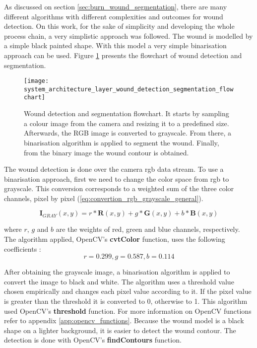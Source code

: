 As discussed on section \ref{sec:burn_wound_segmentation}, there are many different algorithms with different complexities and outcomes for wound detection. On this work, for the sake of simplicity and developing the whole process chain, a very simplistic approach was followed. The wound is modelled by a simple black painted shape. With this model a very simple binarisation approach can be used. Figure \ref{fig:system_architecture_layer_wound_detection_segmentation_flowchart} presents the flowchart of wound detection and segmentation.\\

\begin{figure}[htbp]
	\centering
	\texttt{[image: system\_architecture\_layer\_wound\_detection\_segmentation\_flowchart]}
	\caption[Wound detection and segmentation flowchart.]{Wound detection and segmentation flowchart. It starts by sampling a colour image from the camera and resizing it to a predefined size. Afterwards, the RGB image is converted to grayscale. From there, a binarisation algorithm is applied to segment the wound. Finally, from the binary image the wound contour is obtained.}
	\label{fig:system_architecture_layer_wound_detection_segmentation_flowchart}
\end{figure}

The wound detection is done over the camera \gls{rgb} data stream. To use a binarisation approach, first we need to change the color space from \gls{rgb} to grayscale. This conversion corresponds to a weighted sum of the three color channels, pixel by pixel (\ref{eq:convertion_rgb_grayscale_general}).

\begin{equation}
\boldsymbol{I}_{GRAY}(x,y) = r * \boldsymbol{R}(x,y) + g * \boldsymbol{G}(x,y) + b * \boldsymbol{B}(x,y)
\label{eq:convertion_rgb_grayscale_general}
\end{equation}

where $r$, $g$ and $b$ are the weights of red, green and blue channels, respectively. The algorithm applied,  OpenCV's \textbf{cvtColor} function, uses the following coefficients \cite{OpenCV2020_color_conversions, ITU2020_grayscale_conversion}: 
$$ r = 0.299, g = 0.587, b = 0.114 $$

After obtaining the grayscale image, a binarisation algorithm is applied to convert the image to black and white. The algorithm uses a threshold value chosen empirically and changes each pixel value according to it. If the pixel value is greater than the threshold it is converted to 0, otherwise to 1. This algorithm used OpenCV's \textbf{threshold} function. For more information on OpenCV functions refer to appendix \ref{app:opencv_functions}. Because the wound model is a black shape on a lighter background, it is easier to detect the wound contour. The detection is done with OpenCV's \textbf{findContours} function.

